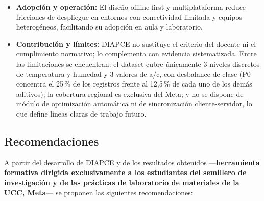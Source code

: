 \begin{itemize}
  \item \textbf{Adopción y operación:} El diseño offline-first y multiplataforma reduce fricciones de despliegue en entornos con conectividad limitada y equipos heterogéneos, facilitando su adopción en aula y laboratorio.

  \item \textbf{Contribución y límites:} DIAPCE no sustituye el criterio del docente ni el cumplimiento normativo; lo complementa con evidencia sistematizada. Entre las limitaciones se encuentran: el dataset cubre únicamente 3 niveles discretos de temperatura y humedad y 3 valores de a/c, con desbalance de clase (P0 concentra el 25\,\% de los registros frente al 12{,}5\,\% de cada uno de los demás aditivos); la cobertura regional es exclusiva del Meta; y no se dispone de módulo de optimización automática ni de sincronización cliente-servidor, lo que define líneas claras de trabajo futuro.
\end{itemize}

\subsection{Recomendaciones}

A partir del desarrollo de DIAPCE y de los resultados obtenidos ---\textbf{herramienta formativa dirigida exclusivamente a los estudiantes del semillero de investigación y de las prácticas de laboratorio de materiales de la UCC, Meta}--- se proponen las siguientes recomendaciones:

